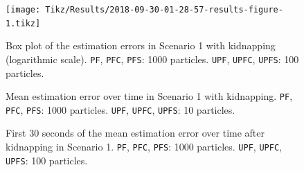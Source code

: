 

\begin{figure}
	\centering
	\setlength\figureheight{0.9\textheight} 	
	\setlength{}		
	\texttt{[image: Tikz/Results/2018-09-30-01-28-57-results-figure-1.tikz]}			
	\caption[Box plot of the estimation errors in Scenario 1 with kidnapping. \texttt{PF}, \texttt{PFC}, \texttt{PFS}: 1000 particles. \texttt{UPF}, \texttt{UPFC}, \texttt{UPFS}: 100 particles.]{Box plot of the estimation errors in Scenario 1 with kidnapping (logarithmic scale). \texttt{PF}, \texttt{PFC}, \texttt{PFS}: 1000 particles. \texttt{UPF}, \texttt{UPFC}, \texttt{UPFS}: 100 particles.}
	\label{fig:2018-09-30-01-28-57-results-figure-1}			
\end{figure}

\begin{figure}
	\centering
	\setlength{} 	
	\setlength\figurewidth{0.9\textheight}		
	\caption[Mean estimation error over time in Scenario 1 with kidnapping. \texttt{PF}, \texttt{PFC}, \texttt{PFS}: 1000 particles. \texttt{UPF}, \texttt{UPFC}, \texttt{UPFS}: 100 particles.]{Mean estimation error over time in Scenario 1 with kidnapping. \texttt{PF}, \texttt{PFC}, \texttt{PFS}: 1000 particles. \texttt{UPF}, \texttt{UPFC}, \texttt{UPFS}: 10 particles.}
	\label{fig:2018-09-30-01-28-57-results-figure-6}			
\end{figure}

\begin{figure}
	\centering
	\setlength{} 	
	\setlength\figurewidth{0.9\textheight}		
	\caption[First 30 seconds of the mean estimation error over time after kidnapping in Scenario 1. \texttt{PF}, \texttt{PFC}, \texttt{PFS}: 1000 particles. \texttt{UPF}, \texttt{UPFC}, \texttt{UPFS}: 10 particles.]{First 30 seconds of the mean estimation error over time after kidnapping in Scenario 1. \texttt{PF}, \texttt{PFC}, \texttt{PFS}: 1000 particles. \texttt{UPF}, \texttt{UPFC}, \texttt{UPFS}: 100 particles.}
	\label{fig:2018-09-30-01-28-57-results-figure-8}			
\end{figure}


